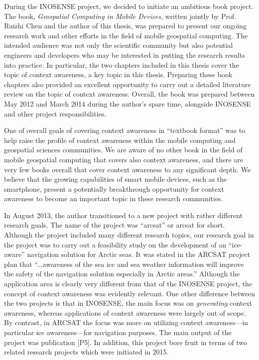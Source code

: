 During the INOSENSE project, we decided to initiate an ambitious book project. The book, \emph{Geospatial Computing in Mobile Devices}, written jointly by Prof. Ruizhi Chen and the author of this thesis, was prepared to present our ongoing research work and other efforts in the field of mobile geospatial computing. The intended audience was not only the scientific community but also potential engineers and developers who may be interested in putting the research results into practice. In particular, the two chapters included in this thesis cover the topic of context awareness, a key topic in this thesis. Preparing these book chapters also provided an excellent opportunity to carry out a detailed literature review on the topic of context awareness. Overall, the book was prepared between May 2012 and March 2014 during the author's spare time, alongside INOSENSE and other project responsibilities. 

One of overall goals of covering context awareness in ``textbook format'' was to help raise the profile of context awareness within the mobile computing and geospatial sciences communities. We are aware of no other book in the field of mobile geospatial computing that covers also context awareness, and there are very few books overall that cover context awareness to any significant depth.  We believe that the growing capabilities of smart mobile devices, such as the smartphone, present a potentially breakthrough opportunity for context awareness to become an important topic in these research communities.

In August 2013, the author transitioned to a new project with rather different research goals. The name of the project was ``\acrlong{arcsat}'' or \acrshort{arcsat} for short. Although the project included many different research topics, our research goal in the project was to carry out a feasibility study on the development of an ``ice-aware'' navigation solution for Arctic seas. It was stated in the ARCSAT project plan that ``...awareness of the sea ice and sea weather information will improve the safety of the navigation solution especially in Arctic areas.'' Although the application area is clearly very different from that of the INOSENSE project, the concept of context awareness was evidently relevant. One other difference between the two projects is that in INOSENSE, the main focus was on \emph{generating} context awareness, whereas applications of context awareness were largely out of scope. By contrast, in ARCSAT the focus was more on utilizing context awareness---in particular ice awareness---for navigation purposes. The main output of the project was publication [P5]. In addition, this project bore fruit in terms of two related research projects which were initiated in 2015.

